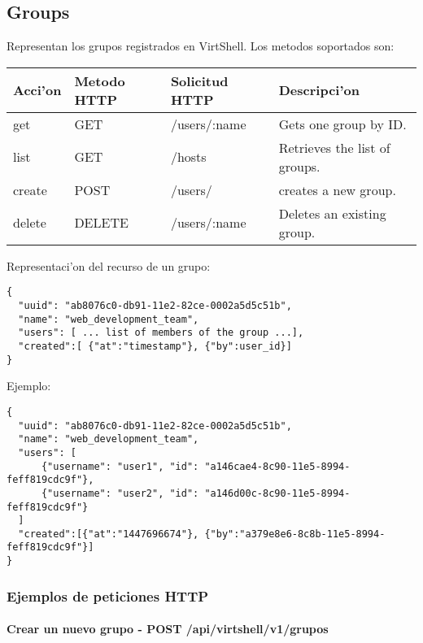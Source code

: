\subsection{Groups}
Representan los grupos registrados en VirtShell. Los metodos soportados son:

\begin{center}
 \begin{tabular}{| l | l | l | l |}
 \hline
  \rowcolor{blueapi}
  \textbf{Acci'on} & \textbf{Metodo HTTP} & \textbf{Solicitud HTTP} & \textbf{Descripci'on} \\ [0.5ex] 
  \hline\hline
  get & GET & /users/:name & Gets one group by ID. \\
  \hline
  list & GET & /hosts & Retrieves the list of groups. \\  
  \hline
  create & POST & /users/ & creates a new group. \\
  \hline
  delete & DELETE & /users/:name & Deletes an existing group. \\
  \hline
\end{tabular}
\end{center}

\vspace{1cm}
Representaci'on del recurso de un grupo:
\vspace{1cm}

\begin{lstlisting}[style=json]
{
  "uuid": "ab8076c0-db91-11e2-82ce-0002a5d5c51b",
  "name": "web_development_team",
  "users": [ ... list of members of the group ...],  
  "created":[ {"at":"timestamp"}, {"by":user_id}]
}
\end{lstlisting}

Ejemplo:

\medskip
\begin{lstlisting}[style=json]
{
  "uuid": "ab8076c0-db91-11e2-82ce-0002a5d5c51b",
  "name": "web_development_team",
  "users": [ 
      {"username": "user1", "id": "a146cae4-8c90-11e5-8994-feff819cdc9f"},
      {"username": "user2", "id": "a146d00c-8c90-11e5-8994-feff819cdc9f"}
  ]
  "created":[{"at":"1447696674"}, {"by":"a379e8e6-8c8b-11e5-8994-feff819cdc9f"}]
}
\end{lstlisting}

\subsubsection{Ejemplos de peticiones HTTP}

\paragraph{Crear un nuevo grupo - POST /api/virtshell/v1/grupos} ~\\

